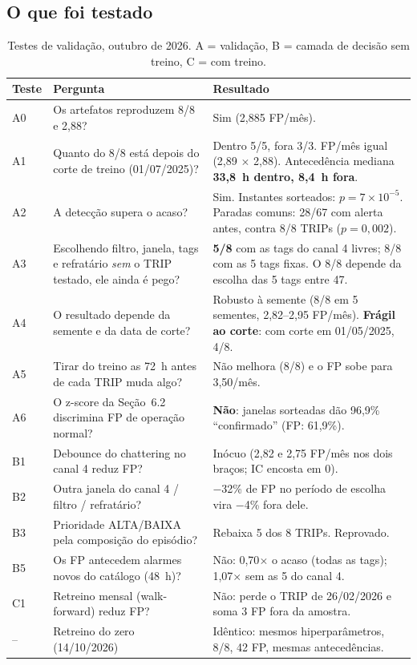 \documentclass[11pt,a4paper]{article}
\begin{document}
\subsection{O que foi testado}

\begin{table}[H]
\centering
\small
\begin{tabular}{p{0.6cm}p{5.6cm}p{7.2cm}}
\toprule
\textbf{Teste} & \textbf{Pergunta} & \textbf{Resultado} \\
\midrule
A0 & Os artefatos reproduzem 8/8 e 2,88? & Sim (2,885 FP/mês). \\
A1 & Quanto do 8/8 está depois do corte de treino (01/07/2025)? & Dentro 5/5, fora 3/3. FP/mês igual (2,89 $\times$ 2,88). Antecedência mediana \textbf{33,8~h dentro, 8,4~h fora}. \\
A2 & A detecção supera o acaso? & Sim. Instantes sorteados: $p = 7\times10^{-5}$. Paradas comuns: 28/67 com alerta antes, contra 8/8 TRIPs ($p = 0{,}002$). \\
A3 & Escolhendo filtro, janela, tags e refratário \emph{sem} o TRIP testado, ele ainda é pego? & \textbf{5/8} com as tags do canal 4 livres; 8/8 com as 5 tags fixas. O 8/8 depende da escolha das 5 tags entre 47. \\
A4 & O resultado depende da semente e da data de corte? & Robusto à semente (8/8 em 5 sementes, 2,82--2,95 FP/mês). \textbf{Frágil ao corte}: com corte em 01/05/2025, 4/8. \\
A5 & Tirar do treino as 72~h antes de cada TRIP muda algo? & Não melhora (8/8) e o FP sobe para 3,50/mês. \\
A6 & O z-score da Seção~6.2 discrimina FP de operação normal? & \textbf{Não}: janelas sorteadas dão 96,9\% ``confirmado'' (FP: 61,9\%). \\
B1 & Debounce do chattering no canal 4 reduz FP? & Inócuo (2,82 e 2,75 FP/mês nos dois braços; IC encosta em 0). \\
B2 & Outra janela do canal 4 / filtro / refratário? & $-$32\% de FP no período de escolha vira $-$4\% fora dele. \\
B3 & Prioridade ALTA/BAIXA pela composição do episódio? & Rebaixa 5 dos 8 TRIPs. Reprovado. \\
B5 & Os FP antecedem alarmes novos do catálogo (48~h)? & Não: 0,70$\times$ o acaso (todas as tags); 1,07$\times$ sem as 5 do canal 4. \\
C1 & Retreino mensal (walk-forward) reduz FP? & Não: perde o TRIP de 26/02/2026 e soma 3 FP fora da amostra. \\
-- & Retreino do zero (14/10/2026) & Idêntico: mesmos hiperparâmetros, 8/8, 42 FP, mesmas antecedências. \\
\bottomrule
\end{tabular}
\caption{Testes de validação, outubro de 2026. A = validação, B = camada
de decisão sem treino, C = com treino.}
\end{table}
\end{document}
